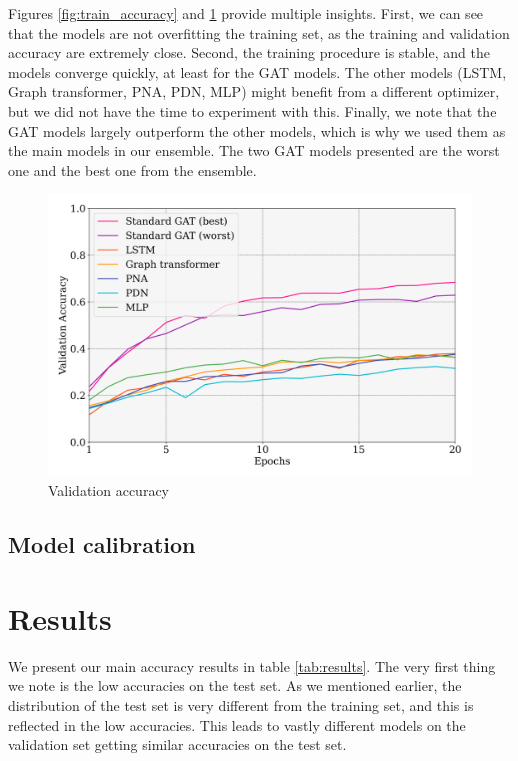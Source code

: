 \documentclass[switch, 11pt]{article}
\begin{document}
\begin{multicols}{2}
    Figures \ref{fig:train_accuracy} and \ref{fig:val_accuracy} provide multiple insights. First, we can see that the models are not overfitting the training set, as the training and validation accuracy are extremely close. Second, the training procedure is stable, and the models converge quickly, at least for the GAT models. The other models (LSTM, Graph transformer, PNA, PDN, MLP) might benefit from a different optimizer, but we did not have the time to experiment with this. Finally, we note that the GAT models largely outperform the other models, which is why we used them as the main models in our ensemble. The two GAT models presented are the worst one and the best one from the ensemble.

    \begin{figure}[H]
        \centering
        \includegraphics[width=\columnwidth]{figures/val_accuracy.png}
        \caption{Validation accuracy}
        \label{fig:val_accuracy}
    \end{figure}

    \subsection{Model calibration}

    \section{Results}
    We present our main accuracy results in table \ref{tab:results}. The very first thing we note is the low accuracies on the test set. As we mentioned earlier, the distribution of the test set is very different from the training set, and this is reflected in the low accuracies. This leads to vastly different models on the validation set getting similar accuracies on the test set.


\end{multicols}
\end{document}
